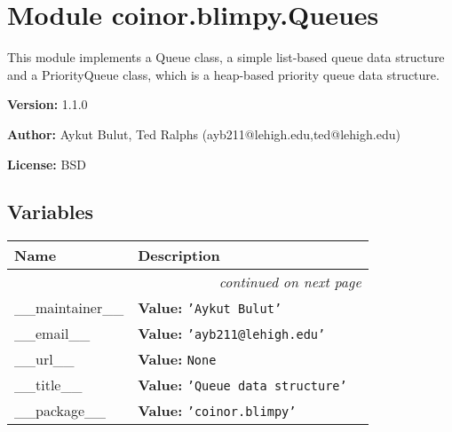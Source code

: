 %
%
%


\section{Module coinor.blimpy.Queues}

    \label{coinor:blimpy:Queues}
This module implements a Queue class, a simple list-based queue data 
structure and a PriorityQueue class, which is a heap-based priority queue 
data structure.

\textbf{Version:} 1.1.0



\textbf{Author:} Aykut Bulut, Ted Ralphs (ayb211@lehigh.edu,ted@lehigh.edu)



\textbf{License:} BSD





  \subsection{Variables}

    \vspace{-1cm}
\hspace{\varindent}\begin{longtable}{|p{\varnamewidth}|p{\vardescrwidth}|l}
\cline{1-2}
\cline{1-2} \centering \textbf{Name} & \centering \textbf{Description}& \\
\cline{1-2}
\endhead\cline{1-2}\multicolumn{3}{r}{\small\textit{continued on next page}}\\\endfoot\cline{1-2}
\endlastfoot\raggedright \_\-\_\-m\-a\-i\-n\-t\-a\-i\-n\-e\-r\-\_\-\_\- & \raggedright \textbf{Value:} 
{\tt \texttt{'}\texttt{Aykut Bulut}\texttt{'}}&\\
\cline{1-2}
\raggedright \_\-\_\-e\-m\-a\-i\-l\-\_\-\_\- & \raggedright \textbf{Value:} 
{\tt \texttt{'}\texttt{ayb211@lehigh.edu}\texttt{'}}&\\
\cline{1-2}
\raggedright \_\-\_\-u\-r\-l\-\_\-\_\- & \raggedright \textbf{Value:} 
{\tt None}&\\
\cline{1-2}
\raggedright \_\-\_\-t\-i\-t\-l\-e\-\_\-\_\- & \raggedright \textbf{Value:} 
{\tt \texttt{'}\texttt{Queue data structure}\texttt{'}}&\\
\cline{1-2}
\raggedright \_\-\_\-p\-a\-c\-k\-a\-g\-e\-\_\-\_\- & \raggedright \textbf{Value:} 
{\tt \texttt{'}\texttt{coinor.blimpy}\texttt{'}}&\\
\cline{1-2}
\end{longtable}


